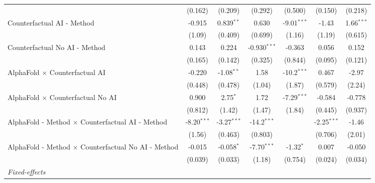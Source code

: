 \begin{tabular}{lcccccc}
                                                              & (0.162)       & (0.209)       & (0.292)        & (0.500)       & (0.150)       & (0.218)\\   
   Counterfactual AI - Method                                 & -0.915        & 0.839$^{**}$  & 0.630          & -9.01$^{***}$ & -1.43         & 1.66$^{***}$\\   
                                                              & (1.09)        & (0.409)       & (0.699)        & (1.16)        & (1.19)        & (0.615)\\   
   Counterfactual No AI - Method                              & 0.143         & 0.224         & -0.930$^{***}$ & -0.363        & 0.056         & 0.152\\   
                                                              & (0.165)       & (0.142)       & (0.325)        & (0.844)       & (0.095)       & (0.121)\\   
   AlphaFold $\times$ Counterfactual AI                       & -0.220        & -1.08$^{**}$  & 1.58           & -10.2$^{***}$ & 0.467         & -2.97\\   
                                                              & (0.448)       & (0.478)       & (1.04)         & (1.87)        & (0.579)       & (2.24)\\   
   AlphaFold $\times$ Counterfactual No AI                    & 0.900         & 2.75$^{*}$    & 1.72           & -7.29$^{***}$ & -0.584        & -0.778\\   
                                                              & (0.812)       & (1.42)        & (1.47)         & (1.84)        & (0.445)       & (0.937)\\   
   AlphaFold - Method $\times$ Counterfactual AI - Method     & -8.20$^{***}$ & -3.27$^{***}$ & -14.2$^{***}$  &               & -2.25$^{***}$ & -1.46\\   
                                                              & (1.56)        & (0.463)       & (0.803)        &               & (0.706)       & (2.01)\\   
   AlphaFold - Method $\times$ Counterfactual No AI - Method  & -0.015        & -0.058$^{*}$  & -7.70$^{***}$  & -1.32$^{*}$   & 0.007         & -0.050\\   
                                                              & (0.039)       & (0.033)       & (1.18)         & (0.754)       & (0.024)       & (0.034)\\   
   \midrule
   \emph{Fixed-effects}\\

\end{tabular}

